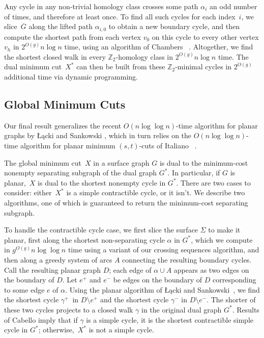 \documentclass[natbib]{svcyclop}
\begin{document}
Any cycle in any non-trivial homology class crosses some path $\alpha_i$ an odd number of times, and therefore at least once.  To find all such cycles for each index~$i$, we slice~$\overline{G}$ along the lifted path $\alpha_{i,0}$ to obtain a new boundary cycle, and then compute the shortest path from each vertex $v_0$ on this cycle to every other vertex $v_h$ in $2^{O(g)}n\log n$ time, using an algorithm of Chambers \etal~\cite{cce-msspe-13}.  Altogether, we find the shortest closed walk in every $\mathbb{Z}_2$-homology class in $2^{O(g)}n\log n$ time.  The dual minimum cut~$X^*$ can then be built from these $\mathbb{Z}_2$-minimal cycles  in $2^{O(g)}$ additional time via dynamic programming.

\subsection{Global Minimum Cuts}

Our final result generalizes the recent $O(n\log \log n)$-time algorithm for planar graphs by Łącki and Sankowski \cite{ls-mcsc-11}, which in turn relies on the $O(n\log\log n)$-time algorithm for planar minimum $(s,t)$-cuts of Italiano \etal\ \cite{insw-iamcmf-11}.

The global minimum cut~$X$ in a surface graph $G$ is dual to the minimum-cost nonempty separating subgraph of the dual graph $G^*$.  In particular, if $G$ is planar,~$X$ is dual to the shortest nonempty cycle in $G^*$.
There are two cases to consider: either~$X^*$ is a simple contractible cycle, or it isn’t.  We describe two algorithms, one of which is guaranteed to return the minimum-cost separating subgraph.

To handle the contractible cycle case, we first slice the surface $\Sigma$ to make it planar, first along the shortest non-separating cycle $\alpha$ in $G^*$, which we compute in $g^{O(g)}n\log\log n$ time using a variant of our crossing sequences algorithm, and then along a greedy system of arcs $A$ connecting the resulting boundary cycles.
Call the resulting planar graph $D$; each edge of $\alpha\cup A$ appears as two edges on the boundary of $D$.  
Let $e^+$ and $e^-$ be edges on the boundary of $D$ corresponding to some edge $e$ of $\alpha$.  Using the planar algorithm of Łącki and Sankowski~\cite{ls-mcsc-11}, we find the shortest cycle $\gamma^+$~in $D\setminus e^+$ and the shortest cycle $\gamma^-$ in $D\setminus e^-$.  The shorter of these two cycles projects to a closed walk $\gamma$ in the original dual graph $G^*$.  Results of Cabello \cite{c-fscss-10} imply that if $\gamma$ is a simple cycle, it is the shortest contractible simple cycle in $G^*$; otherwise,~$X^*$ is not a simple cycle.
\end{document}
